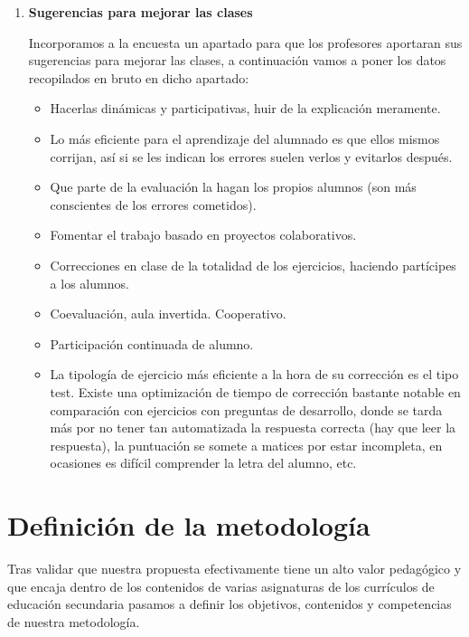 \begin{enumerate}
\item \textbf{Sugerencias para mejorar las clases}

Incorporamos a la encuesta un apartado para que los profesores aportaran sus sugerencias para mejorar las clases, a continuación vamos a poner los datos recopilados en bruto en dicho apartado:

\begin{itemize}
    \item Hacerlas dinámicas y participativas, huir de la explicación meramente.
    \item Lo más eficiente para el aprendizaje del alumnado es que ellos mismos corrijan, así si se les indican los errores suelen verlos y evitarlos después.
    \item Que parte de la evaluación la hagan los propios alumnos (son más conscientes de los errores cometidos).
    \item Fomentar el trabajo basado en proyectos colaborativos.
    \item Correcciones en clase de la totalidad de los ejercicios, haciendo partícipes a los alumnos.
    \item Coevaluación, aula invertida. Cooperativo.
    \item Participación continuada de alumno.
    \item La tipología de ejercicio más eficiente a la hora de su corrección es el tipo test. Existe una optimización de tiempo de corrección bastante notable en comparación con ejercicios con preguntas de desarrollo, donde se tarda más por no tener tan automatizada la respuesta correcta (hay que leer la respuesta), la puntuación se somete a matices por estar incompleta, en ocasiones es difícil comprender la letra del alumno, etc.
\end{itemize}


\end{enumerate}

\section{Definición de la metodología}


Tras validar que nuestra propuesta efectivamente tiene un alto valor pedagógico y que encaja dentro de los contenidos de varias asignaturas de los currículos de educación secundaria pasamos a definir los objetivos, contenidos y competencias de nuestra metodología.

